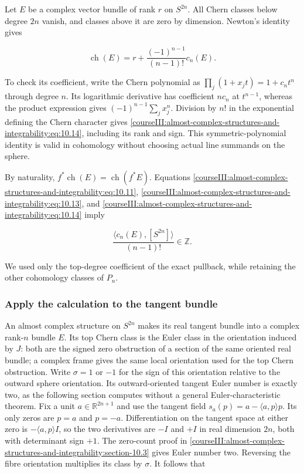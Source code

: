 Let \(E\) be a complex vector bundle of rank \(r\) on \(S^{2n}\). All Chern classes below degree \(2n\) vanish, and classes above it are zero by dimension. Newton's identity gives

\begin{equation}
\operatorname{ch}(E)=r+
\frac{(-1)^{n-1}}{(n-1)!}c_n(E).
\label{courseIII:almost-complex-structures-and-integrability:eq:10.14}
\end{equation}

To check its coefficient, write the Chern polynomial as \(\prod_j(1+x_jt)=1+c_n t^n\) through degree \(n\). Its logarithmic derivative has coefficient \(nc_n\) at \(t^{n-1}\), whereas the product expression gives \((-1)^{n-1}\sum_jx_j^n\). Division by \(n!\) in the exponential defining the Chern character gives \eqref{courseIII:almost-complex-structures-and-integrability:eq:10.14}, including its rank and sign. This symmetric-polynomial identity is valid in cohomology without choosing actual line summands on the sphere.

By naturality, \(f^*\operatorname{ch}(E)=\operatorname{ch}(f^*E)\). Equations \eqref{courseIII:almost-complex-structures-and-integrability:eq:10.11}, \eqref{courseIII:almost-complex-structures-and-integrability:eq:10.13}, and \eqref{courseIII:almost-complex-structures-and-integrability:eq:10.14} imply

\begin{equation}
\frac{\langle c_n(E),[S^{2n}]\rangle}{(n-1)!}\in\mathbb Z.
\label{courseIII:almost-complex-structures-and-integrability:eq:10.15}
\end{equation}

We used only the top-degree coefficient of the exact pullback, while retaining the other cohomology classes of \(P_n\).

\subsubsection{Apply the calculation to the tangent bundle}
\label{courseIII:almost-complex-structures-and-integrability:section-10.5}

An almost complex structure on \(S^{2n}\) makes its real tangent bundle into a complex rank-\(n\) bundle \(E\). Its top Chern class is the Euler class in the orientation induced by \(J\): both are the signed zero obstruction of a section of the same oriented real bundle; a complex frame gives the same local orientation used for the top Chern obstruction. Write \(\sigma=1\) or \(-1\) for the sign of this orientation relative to the outward sphere orientation. Its outward-oriented tangent Euler number is exactly two, as the following section computes without a general Euler-characteristic theorem. Fix a unit \(a\in\mathbb R^{2n+1}\) and use the tangent field \(s_a(p)=a-\langle a,p\rangle p\). Its only zeros are \(p=a\) and \(p=-a\). Differentiation on the tangent space at either zero is \(-\langle a,p\rangle I\), so the two derivatives are \(-I\) and \(+I\) in real dimension \(2n\), both with determinant sign \(+1\). The zero-count proof in \cref{courseIII:almost-complex-structures-and-integrability:section-10.3} gives Euler number two. Reversing the fibre orientation multiplies its class by \(\sigma\). It follows that

